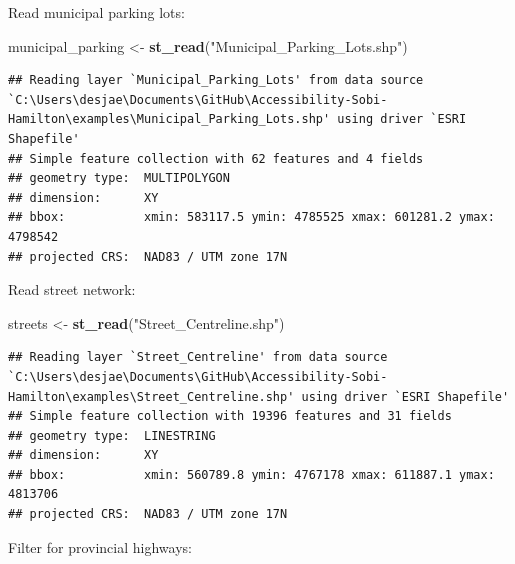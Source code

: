 \documentclass[
]{article}
\newenvironment{Shaded}{\begin{snugshade}}{\end{snugshade}}
\newcommand{\KeywordTok}[1]{\textcolor[rgb]{0.13,0.29,0.53}{\textbf{#1}}}
\newcommand{\NormalTok}[1]{#1}
\newcommand{\OperatorTok}[1]{\textcolor[rgb]{0.81,0.36,0.00}{\textbf{#1}}}
\newcommand{\StringTok}[1]{\textcolor[rgb]{0.31,0.60,0.02}{#1}}
\begin{document}
Read municipal parking lots:

\begin{Shaded}
\begin{Highlighting}[]
\NormalTok{municipal_parking <-}\StringTok{ }\KeywordTok{st_read}\NormalTok{(}\StringTok{"Municipal_Parking_Lots.shp"}\NormalTok{)}
\end{Highlighting}
\end{Shaded}

\begin{verbatim}
## Reading layer `Municipal_Parking_Lots' from data source `C:\Users\desjae\Documents\GitHub\Accessibility-Sobi-Hamilton\examples\Municipal_Parking_Lots.shp' using driver `ESRI Shapefile'
## Simple feature collection with 62 features and 4 fields
## geometry type:  MULTIPOLYGON
## dimension:      XY
## bbox:           xmin: 583117.5 ymin: 4785525 xmax: 601281.2 ymax: 4798542
## projected CRS:  NAD83 / UTM zone 17N
\end{verbatim}

Read street network:

\begin{Shaded}
\begin{Highlighting}[]
\NormalTok{streets <-}\StringTok{ }\KeywordTok{st_read}\NormalTok{(}\StringTok{"Street_Centreline.shp"}\NormalTok{)}
\end{Highlighting}
\end{Shaded}

\begin{verbatim}
## Reading layer `Street_Centreline' from data source `C:\Users\desjae\Documents\GitHub\Accessibility-Sobi-Hamilton\examples\Street_Centreline.shp' using driver `ESRI Shapefile'
## Simple feature collection with 19396 features and 31 fields
## geometry type:  LINESTRING
## dimension:      XY
## bbox:           xmin: 560789.8 ymin: 4767178 xmax: 611887.1 ymax: 4813706
## projected CRS:  NAD83 / UTM zone 17N
\end{verbatim}

Filter for provincial highways:

\begin{Shaded}
\end{Shaded}
\end{document}
